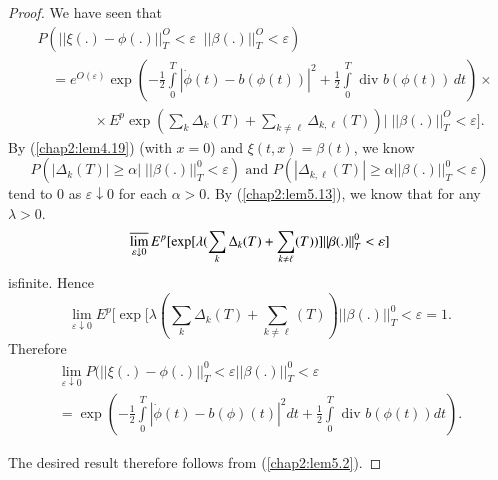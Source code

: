    \begin{proof}
We have seen that 
\begin{align*}
& P( || \xi (.) - \phi (.) ||_T^O <\varepsilon \;\; || \beta (.) ||_T^O < 
\varepsilon )\\ 
& \quad = e^{O(\varepsilon )} \exp (-\frac{1}{2} \int\limits^T_0 |
\dot{\phi}(t) - b(\phi(t)) |^2 + \frac{1}{2} \int\limits^T_0 
\text{ div } b (\phi (t)) \, dt ) \times   \\ 
& \qquad \qquad \times  E^p \exp (\sum_k \Delta_k (T) +\sum_{k \neq \ell}
\Delta_{k, \ell}(T))|\; ||\beta (.)||^O_T < \varepsilon ]. 
\end{align*}
 By (\ref{chap2:lem4.19}) (with $x = 0$) and $\xi (t, x) = \beta (t)$,
 we know   
 $$
 P (|\Delta_k (T)| \geq \alpha |\; || \beta(.)||^0_T < \varepsilon )
 \text{ and }  P (|\Delta_{k, \ell} (T) | \geq \alpha ||
 \beta(.)||^0_T < \varepsilon)  
 $$
tend to 0 as $ \varepsilon \downarrow 0$ for each $ \alpha > 0$. By
(\ref{chap2:lem5.13}), we know that for any $\lambda > 0$.  
$$
\varlimsup_{\varepsilon \downarrow 0} E^p [\exp [\lambda (\sum_k
    \Delta_k (T) + \sum\limits_{k\neq \ell} (T))] || \beta (.)||^0_T <
  \varepsilon]   
$$
is\pageoriginale finite. Hence  
$$
\lim_{\varepsilon \downarrow 0} E^p [\exp [\lambda (\sum_k \Delta_k(T)
    + \sum_{k\neq \ell} (T)) ||  \beta (.)||^0_T < \varepsilon = 1.  
$$
Therefore
\begin{gather*}
\lim_{\varepsilon \downarrow 0} P( || \xi (.) - \phi (.)||^0_T <
\varepsilon || \beta (.) ||^0_T <\varepsilon \\ 
= \exp (- \frac{1}{2}\int\limits^{T}_0 | \dot{\phi} (t) - b (\phi)(t) |^2
dt +\frac{1}{2} \int\limits^T_0\text{ div } b (\phi(t))dt). 
\end{gather*}

The desired result therefore follows from (\ref{chap2:lem5.2}). 
 \end{proof}

